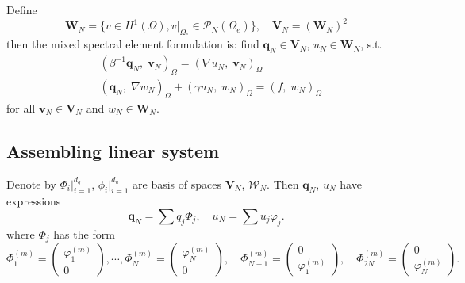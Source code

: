 \documentclass[10pt,reqno, final]{amsart}
\newcommand{\bs}[1]{\boldsymbol{#1}}
\begin{document}
Define
\begin{equation}
{\bs W}_N=\{ v\in H^1(\Omega), v|_{\Omega_e}\in \mathcal{P}_N(\Omega_e)\},\quad \bs V_N=(\bs W_N)^2
\end{equation}
then the mixed spectral element formulation is: find ${\bs q}_N\in {\bs V}_N$, $u_N\in {\bs W}_N$, s.t.
\begin{eqnarray}
&(\beta^{-1}{\bs q_N}, \;\bs v_N)_{\Omega}  =(\nabla u_N, \;\bs v_N)_{\Omega}\nonumber\\
&({\bs q_N},\;\nabla w_N)_{\Omega} + (\gamma u_N,\; w_N)_{\Omega} =(f,\; w_N)_{\Omega} \label{localsolver}
\end{eqnarray}
for all ${\bs v}_N\in {\bs V}_N$ and $w_N\in {\bs W}_N$.

\subsection{Assembling linear system}
Denote by $\Phi_i\big|_{i=1}^{d_q}$, $\phi_i\big|_{i=1}^{d_u}$  are basis of spaces
${\bs V}_N$, $\mathcal{W}_N$. Then ${\bs q}_N$, $u_N$ have expressions
$${\bs q}_N=\sum q_j\Phi_j,\quad u_N=\sum u_j\varphi_j.$$
where $\Phi_j$ has the form
\begin{equation}
\Phi_1^{(m)}=\begin{pmatrix}
\varphi^{(m)}_1\\
0
\end{pmatrix},\cdots,
\Phi_{N}^{(m)}=\begin{pmatrix}
\varphi^{(m)}_{N}\\
0
\end{pmatrix},\quad
\Phi_{N+1}^{(m)}=\begin{pmatrix}
0\\
\varphi^{(m)}_1
\end{pmatrix},\quad \Phi_{2N}^{(m)}=\begin{pmatrix}
0\\
\varphi^{(m)}_{N}
\end{pmatrix}.
\end{equation}
\end{document}
